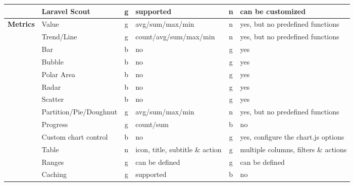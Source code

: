 \begin{table}[h!]
{\begin{tabular}{llclcl}
            & Laravel Scout          & g           & supported                       & n           & can be customized                        \\
            \hline
            \multirow{15}{*}{\textbf{Metrics}}       & Value                  & g           & avg/sum/max/min                 & n           & yes, but no predefined functions         \\
            & Trend/Line             & g           & count/avg/sum/max/min           & n           & yes, but no predefined functions         \\
            & Bar                    & b           & no                              & g           & yes                                      \\
            & Bubble                 & b           & no                              & g           & yes                                      \\
            & Polar Area             & b           & no                              & g           & yes                                      \\
            & Radar                  & b           & no                              & g           & yes                                      \\
            & Scatter                & b           & no                              & g           & yes                                      \\
            & Partition/Pie/Doughnut & g           & avg/sum/max/min                 & n           & yes, but no predefined functions         \\
            & Progress               & g           & count/sum                       & b           & no                                       \\
            & Custom chart control   & b           & no                              & g           & yes, configure the chart.js options      \\
            & Table                  & n           & icon, title, subtitle \& action & g           & multiple columns, filters \& actions     \\
            & Ranges                 & g           & can be defined                  & g           & can be defined                           \\
            & Caching                & g           & supported                       & b           & no                                       \\

\end{tabular}}
\end{table}
